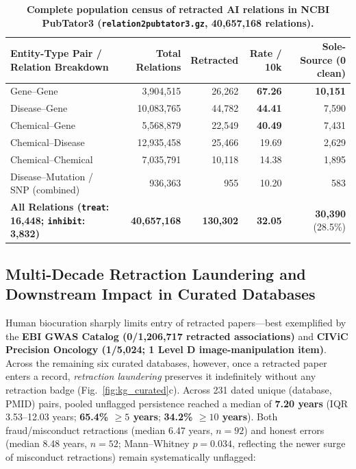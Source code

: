 \documentclass[11pt,letterpaper]{article}
\begin{document}
\begin{table}[t]
\centering
\caption{\textbf{Complete population census of retracted AI relations in NCBI PubTator3 (\texttt{relation2pubtator3.gz}, 40,657,168 relations).}}
\label{tab:pubtator3}
\footnotesize
\setlength{\tabcolsep}{4pt}
\begin{tabularx}{\textwidth}{@{} >{\raggedright\arraybackslash}X r r r r @{}}
\toprule
\textbf{Entity-Type Pair / Relation Breakdown} & \textbf{Total Relations} & \textbf{Retracted} & \textbf{Rate / 10k} & \textbf{Sole-Source (0 clean)} \\
\midrule
Gene--Gene & 3,904,515 & 26,262 & \textbf{67.26} & \textbf{10,151} \\
Disease--Gene & 10,083,765 & 44,782 & \textbf{44.41} & 7,590 \\
Chemical--Gene & 5,568,879 & 22,549 & \textbf{40.49} & 7,431 \\
Chemical--Disease & 12,935,458 & 25,466 & 19.69 & 2,629 \\
Chemical--Chemical & 7,035,791 & 10,118 & 14.38 & 1,895 \\
Disease--Mutation / SNP (combined) & 936,363 & 955 & 10.20 & 583 \\
\midrule
\textbf{All Relations (\texttt{treat}: 16,448; \texttt{inhibit}: 3,832)} & \textbf{40,657,168} & \textbf{130,302} & \textbf{32.05} & \textbf{30,390} (28.5\%) \\
\bottomrule
\end{tabularx}
\end{table}

\subsection{Multi-Decade Retraction Laundering and Downstream Impact in Curated Databases}
Human biocuration sharply limits entry of retracted papers—best exemplified by the \textbf{EBI GWAS Catalog (0/1,206,717 retracted associations)} and \textbf{CIViC Precision Oncology (1/5,024; 1 Level D image-manipulation item)}. Across the remaining six curated databases, however, once a retracted paper enters a record, \emph{retraction laundering} preserves it indefinitely without any retraction badge (Fig.~\ref{fig:kg_curated}c). Across 231 dated unique (database, PMID) pairs, pooled unflagged persistence reached a median of \textbf{7.20 years} (IQR 3.53--12.03 years; \textbf{65.4\% $\ge 5$ years}; \textbf{34.2\% $\ge 10$ years}). Both fraud/misconduct retractions (median 6.47 years, $n=92$) and honest errors (median 8.48 years, $n=52$; Mann--Whitney $p=0.034$, reflecting the newer surge of misconduct retractions) remain systematically unflagged:
\end{document}
